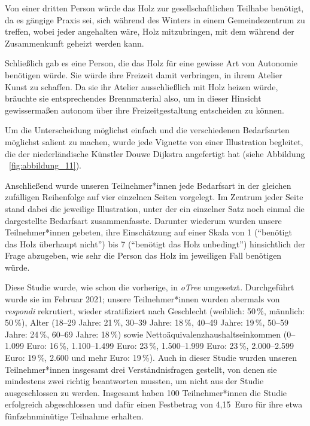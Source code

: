 \documentclass[justified,nobib,nohyper,symmetric,twoside]{tufte-book}
\begin{document}
Von einer dritten Person würde das Holz zur gesellschaftlichen Teilhabe benötigt, da es gängige Praxis sei, sich während des Winters in einem Gemeindezentrum zu treffen, wobei jeder angehalten wäre, Holz mitzubringen, mit dem während der Zusammenkunft geheizt werden kann.

Schließlich gab es eine Person, die das Holz für eine gewisse Art von Autonomie benötigen würde.
Sie würde ihre Freizeit damit verbringen, in ihrem Atelier Kunst zu schaffen.
Da sie ihr Atelier ausschließlich mit Holz heizen würde, bräuchte sie entsprechendes Brennmaterial also, um in dieser Hinsicht gewissermaßen autonom über ihre Freizeitgestaltung entscheiden zu können.

Um die Unterscheidung möglichst einfach und die verschiedenen Bedarfsarten möglichst salient zu machen, wurde jede Vignette von einer Illustration begleitet, die der niederländische Künstler Douwe Dijkstra angefertigt hat (siehe Abbildung ~\ref{fig:abbildung_11}).

Anschließend wurde unseren Teilnehmer*innen jede Bedarfsart in der gleichen zufälligen Reihenfolge auf vier einzelnen Seiten vorgelegt.
Im Zentrum jeder Seite stand dabei die jeweilige Illustration, unter der ein einzelner Satz noch einmal die dargestellte Bedarfsart zusammenfasste.
Darunter wiederum wurden unsere Teilnehmer*innen gebeten, ihre Einschätzung auf einer Skala von 1 (\enquote{benötigt das Holz überhaupt nicht}) bis 7 (\enquote{benötigt das Holz unbedingt}) hinsichtlich der Frage abzugeben, wie sehr die Person das Holz im jeweiligen Fall benötigen würde.

Diese Studie wurde, wie schon die vorherige, in \textit{oTree} umgesetzt.
Durchgeführt wurde sie im Februar 2021; unsere Teilnehmer*innen wurden abermals von \textit{respondi} rekrutiert, wieder stratifiziert nach Geschlecht (weiblich: 50\,\%, männlich: 50\,\%), Alter (18--29 Jahre: 21\,\%, 30--39 Jahre: 18\,\%, 40--49 Jahre: 19\,\%, 50--59 Jahre: 24\,\%, 60--69 Jahre: 18\,\%) sowie Nettoäquivalenzhaushaltseinkommen (0--1.099 Euro: 16\,\%, 1.100--1.499 Euro: 23\,\%, 1.500--1.999 Euro: 23\,\%, 2.000--2.599 Euro: 19\,\%, 2.600 und mehr Euro: 19\,\%).
Auch in dieser Studie wurden unseren Teilnehmer*innen insgesamt drei Verständnisfragen gestellt, von denen sie mindestens zwei richtig beantworten mussten, um nicht aus der Studie ausgeschlossen zu werden.
Insgesamt haben 100 Teilnehmer*innen die Studie erfolgreich abgeschlossen und dafür einen Festbetrag von 4,15~Euro für ihre etwa fünfzehnminütige Teilnahme erhalten.
\end{document}

